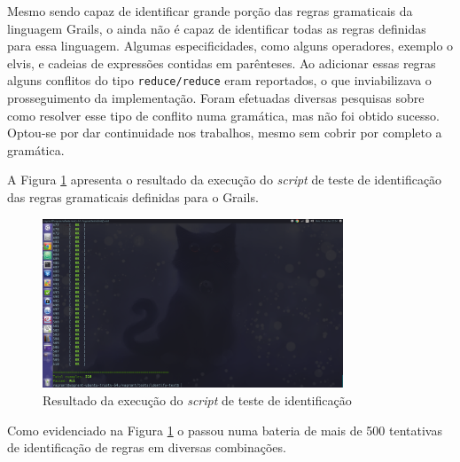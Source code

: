 Mesmo sendo capaz de identificar grande porção das regras gramaticais da
linguagem \textsf{Grails}, o \parser ainda não é capaz de identificar todas
as regras definidas para essa linguagem. Algumas especificidades, como alguns
operadores, exemplo o \textsf{elvis}, e cadeias de expressões contidas
em parênteses. Ao adicionar essas regras alguns conflitos do tipo
\lstinline|reduce/reduce| eram reportados, o que inviabilizava o
prosseguimento da implementação. Foram efetuadas diversas pesquisas
sobre como resolver esse tipo de conflito numa gramática, mas não foi
obtido sucesso. Optou-se por dar continuidade nos trabalhos, mesmo sem
cobrir por completo a gramática.

A Figura \ref{identification-test} apresenta o resultado da execução do
\textit{script} de teste de identificação das regras gramaticais definidas
para o \textsf{Grails}.
\begin{figure}[h]
  \centering
    \includegraphics[width=0.8\textwidth]{figuras/identification-test.png}
    \caption{Resultado da execução do \textit{script} de teste de identificação}
    \label{identification-test}
\end{figure}
\FloatBarrier

Como evidenciado na Figura \ref{identification-test} o \parser passou numa
bateria de mais de 500 tentativas de identificação de regras em diversas
combinações.